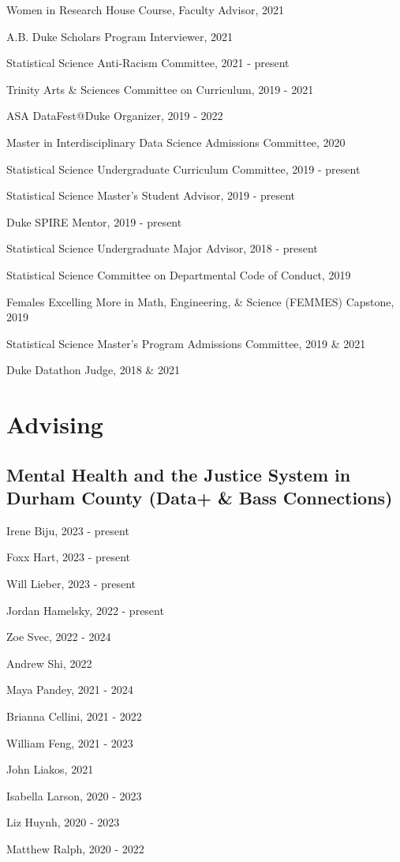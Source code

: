 \documentclass[11pt,dvipsnames]{article}
\renewenvironment{itemize}{
  \begin{list}{}{
    \setlength{\leftmargin}{1.5em}
  }
}{
  \end{list}
}
\begin{document}
Women in Research House Course, Faculty Advisor, 2021

A.B. Duke Scholars Program Interviewer, 2021

Statistical Science Anti-Racism Committee, 2021 - present

Trinity Arts \& Sciences Committee on Curriculum, 2019 - 2021

ASA DataFest@Duke Organizer, 2019 - 2022

Master in Interdisciplinary Data Science Admissions Committee, 2020

Statistical Science Undergraduate Curriculum Committee, 2019 - present

Statistical Science Master's Student Advisor, 2019 - present

Duke SPIRE Mentor, 2019 - present

Statistical Science Undergraduate Major Advisor, 2018 - present

Statistical Science Committee on Departmental Code of Conduct, 2019

Females Excelling More in Math, Engineering, \& Science (FEMMES)
Capstone, 2019

Statistical Science Master's Program Admissions Committee, 2019 \& 2021

Duke Datathon Judge, 2018 \& 2021

\hypertarget{advising}{%
\section{Advising}\label{advising}}

\hypertarget{mental-health-and-the-justice-system-in-durham-county-data-bass-connections}{%
\subsection{Mental Health and the Justice System in Durham County (Data+
\& Bass
Connections)}\label{mental-health-and-the-justice-system-in-durham-county-data-bass-connections}}

\begin{multicols}{2}
\begin{itemize}
\item Irene Biju, 2023 - present
\item Foxx Hart, 2023 - present
\item Will Lieber, 2023 - present
\item Jordan Hamelsky, 2022 - present
\item Zoe Svec, 2022 - 2024
\item Andrew Shi, 2022
\item Maya Pandey, 2021 - 2024
\item Brianna Cellini, 2021 - 2022
\item William Feng, 2021 - 2023
\item John Liakos, 2021
\item Isabella Larson, 2020 - 2023
\item Liz Huynh, 2020 - 2023
\item Matthew Ralph, 2020 - 2022
\end{itemize}
\end{multicols}
\end{document}
